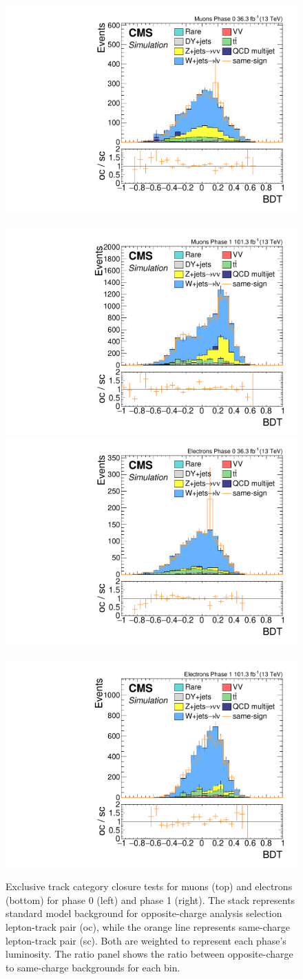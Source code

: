 \begin{figure}[!htb]
\centering
\includegraphics[width=0.48\linewidth]{plots/track_muon_sc_comparison/none_exTrack_dilepBDTCorrJetNoMultIso10Dr0.6.pdf} \,
\includegraphics[width=0.48\linewidth]{plots/track_muon_sc_comparison_phase1/none_exTrack_dilepBDTCorrJetNoMultIso10Dr0.6.pdf}  \\
\includegraphics[width=0.48\linewidth]{plots/track_electron_sc_comparison/none_exTrack_dilepBDTCorrJetNoMultIso10Dr0.5.pdf} \,
\includegraphics[width=0.48\linewidth]{plots/track_electron_sc_comparison_phase1/none_exTrack_dilepBDTCorrJetNoMultIso10Dr0.5.pdf} \\
\caption[Exclusive track category closure tests]{Exclusive track category closure tests for muons (top) and electrons (bottom) for phase 0 (left) and phase 1 (right). The stack represents standard model background for opposite-charge analysis selection lepton-track pair (oc), while the orange line represents same-charge lepton-track pair (sc). Both are weighted to represent each phase's luminosity. The ratio panel shows the ratio between opposite-charge to same-charge backgrounds for each bin.}
\label{fig:ex-track-closure-tests}
\end{figure}